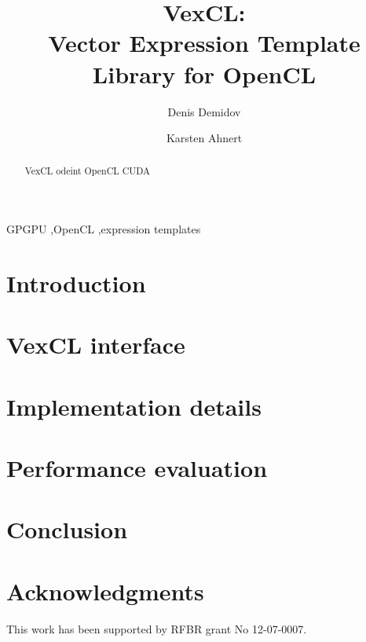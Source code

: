 \documentclass{elsarticle}
\begin{document}
\begin{frontmatter}

\title{VexCL:\\Vector Expression Template Library for OpenCL}

\author{Denis Demidov}
\address{
Russian Academy of Sciences,
Kazan Branch of Joint Supercomputer Center,\\
Lobachevsky st. 2/31, 420008 Kazan, Russia
}

\author{Karsten Ahnert}
\address{
Institut f\"ur Physik und Astronomie, Universit\"at Potsdam,\\
Karl-Liebknecht-Strasse 24/25, 14476 Potsdam-Golm, Germany
}

\begin{abstract}
    VexCL odeint OpenCL CUDA
\end{abstract}

\begin{keyword}
    GPGPU \sep OpenCL \sep expression templates
\end{keyword}

\end{frontmatter}

\section{Introduction}

\section{VexCL interface}

\section{Implementation details}

\section{Performance evaluation}

\section{Conclusion}

\section{Acknowledgments}

This work has been supported by RFBR grant No 12-07-0007.



\end{document}
